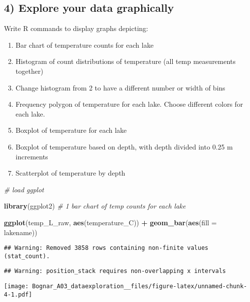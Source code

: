 \documentclass[]{article}
\newenvironment{Shaded}{\begin{snugshade}}{\end{snugshade}}
\newcommand{\KeywordTok}[1]{\textcolor[rgb]{0.13,0.29,0.53}{\textbf{#1}}}
\newcommand{\DataTypeTok}[1]{\textcolor[rgb]{0.13,0.29,0.53}{#1}}
\newcommand{\StringTok}[1]{\textcolor[rgb]{0.31,0.60,0.02}{#1}}
\newcommand{\CommentTok}[1]{\textcolor[rgb]{0.56,0.35,0.01}{\textit{#1}}}
\newcommand{\OperatorTok}[1]{\textcolor[rgb]{0.81,0.36,0.00}{\textbf{#1}}}
\newcommand{\NormalTok}[1]{#1}
\providecommand{\tightlist}{%
  \setlength{\itemsep}{0pt}\setlength{\parskip}{0pt}}
\begin{document}
\subsection{4) Explore your data
graphically}\label{explore-your-data-graphically}

Write R commands to display graphs depicting:

\begin{enumerate}
\def\labelenumi{\arabic{enumi}.}
\tightlist
\item
  Bar chart of temperature counts for each lake
\item
  Histogram of count distributions of temperature (all temp measurements
  together)
\item
  Change histogram from 2 to have a different number or width of bins
\item
  Frequency polygon of temperature for each lake. Choose different
  colors for each lake.
\item
  Boxplot of temperature for each lake
\item
  Boxplot of temperature based on depth, with depth divided into 0.25 m
  increments
\item
  Scatterplot of temperature by depth
\end{enumerate}

\begin{Shaded}
\begin{Highlighting}[]
\CommentTok{# load ggplot}

\KeywordTok{library}\NormalTok{(ggplot2)}
\CommentTok{# 1 bar chart of temp counts for each lake }

\KeywordTok{ggplot}\NormalTok{(temp_L_raw, }\KeywordTok{aes}\NormalTok{(temperature_C)) }\OperatorTok{+}
\StringTok{  }\KeywordTok{geom_bar}\NormalTok{(}\KeywordTok{aes}\NormalTok{(}\DataTypeTok{fill =}\NormalTok{ lakename))}
\end{Highlighting}
\end{Shaded}

\begin{verbatim}
## Warning: Removed 3858 rows containing non-finite values (stat_count).
\end{verbatim}

\begin{verbatim}
## Warning: position_stack requires non-overlapping x intervals
\end{verbatim}

\texttt{[image: Bognar\_A03\_dataexploration\_\_files/figure-latex/unnamed-chunk-4-1.pdf]}
\end{document}
